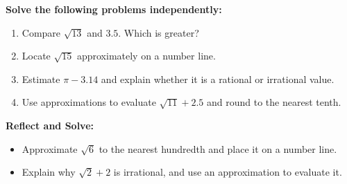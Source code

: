 \documentclass[12pt]{article}
\begin{document}
\begin{tcolorbox}[colframe=black!60, colback=white, 
coltitle=black, colbacktitle=black!15, fonttitle=\bfseries\Large, 
title=Independent Practice, halign title=center, left=10pt, right=10pt, top=10pt, bottom=15pt]
\textbf{Solve the following problems independently:}
\begin{enumerate}[itemsep=3em]
    \item Compare \( \sqrt{13} \) and \( 3.5 \). Which is greater?
    \item Locate \( \sqrt{15} \) approximately on a number line.
    \item Estimate \( \pi - 3.14 \) and explain whether it is a rational or irrational value.
    \item Use approximations to evaluate \( \sqrt{11} + 2.5 \) and round to the nearest tenth.
\end{enumerate}
\end{tcolorbox}

\begin{tcolorbox}[colframe=black!60, colback=white, 
coltitle=black, colbacktitle=black!15, fonttitle=\bfseries\Large, 
title=Exit Ticket, halign title=center, left=10pt, right=10pt, top=10pt, bottom=15pt]
\textbf{Reflect and Solve:}
\begin{itemize}
    \item Approximate \( \sqrt{6} \) to the nearest hundredth and place it on a number line.
    \item Explain why \( \sqrt{2} + 2 \) is irrational, and use an approximation to evaluate it.
\end{itemize}
\end{tcolorbox}
\end{document}
